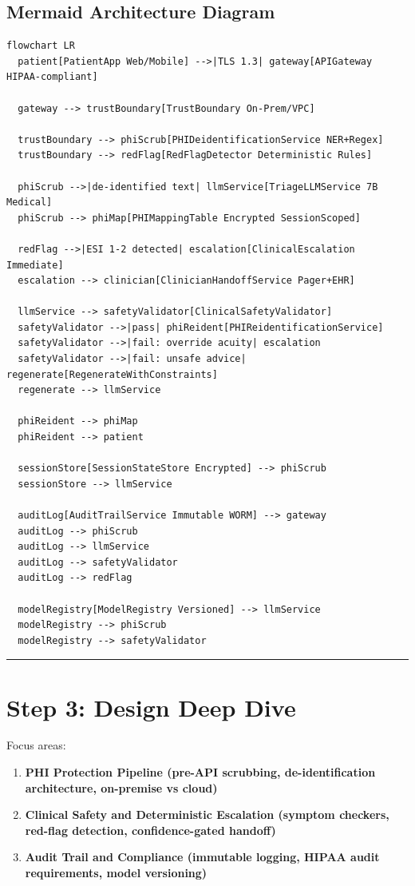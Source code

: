 \subsection*{Mermaid Architecture Diagram}

\begin{verbatim}
flowchart LR
  patient[PatientApp Web/Mobile] -->|TLS 1.3| gateway[APIGateway HIPAA-compliant]

  gateway --> trustBoundary[TrustBoundary On-Prem/VPC]

  trustBoundary --> phiScrub[PHIDeidentificationService NER+Regex]
  trustBoundary --> redFlag[RedFlagDetector Deterministic Rules]

  phiScrub -->|de-identified text| llmService[TriageLLMService 7B Medical]
  phiScrub --> phiMap[PHIMappingTable Encrypted SessionScoped]

  redFlag -->|ESI 1-2 detected| escalation[ClinicalEscalation Immediate]
  escalation --> clinician[ClinicianHandoffService Pager+EHR]

  llmService --> safetyValidator[ClinicalSafetyValidator]
  safetyValidator -->|pass| phiReident[PHIReidentificationService]
  safetyValidator -->|fail: override acuity| escalation
  safetyValidator -->|fail: unsafe advice| regenerate[RegenerateWithConstraints]
  regenerate --> llmService

  phiReident --> phiMap
  phiReident --> patient

  sessionStore[SessionStateStore Encrypted] --> phiScrub
  sessionStore --> llmService

  auditLog[AuditTrailService Immutable WORM] --> gateway
  auditLog --> phiScrub
  auditLog --> llmService
  auditLog --> safetyValidator
  auditLog --> redFlag

  modelRegistry[ModelRegistry Versioned] --> llmService
  modelRegistry --> phiScrub
  modelRegistry --> safetyValidator
\end{verbatim}

\bigskip\hrule\bigskip

\section*{Step 3: Design Deep Dive}

Focus areas:
\begin{enumerate}
  \item \textbf{PHI Protection Pipeline (pre-API scrubbing, de-identification architecture, on-premise vs cloud)}
  \item \textbf{Clinical Safety and Deterministic Escalation (symptom checkers, red-flag detection, confidence-gated handoff)}
  \item \textbf{Audit Trail and Compliance (immutable logging, HIPAA audit requirements, model versioning)}
\end{enumerate}


